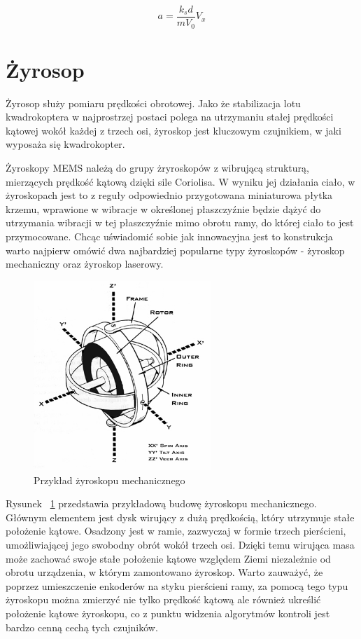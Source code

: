 \begin{equation}
	a = \frac{k{_s}d}{mV_0}V_x
\end{equation}

\section{Żyrosop}

Żyrosop służy pomiaru prędkości obrotowej. Jako że stabilizacja lotu kwadrokoptera w najprostrzej postaci polega na utrzymaniu stałej prędkości kątowej wokół każdej z trzech osi, żyroskop jest kluczowym czujnikiem, w jaki wyposaża się kwadrokopter. 

Żyroskopy MEMS należą do grupy żryroskopów z wibrującą strukturą, mierzących prędkość kątową dzięki sile Coriolisa. W wyniku jej działania ciało, w żyroskopach jest to z reguły odpowiednio przygotowana miniaturowa płytka krzemu, wprawione w wibracje w określonej płaszczyźnie będzie dążyć do utrzymania wibracji w tej płaszczyźnie mimo obrotu ramy, do której ciało to jest przymocowane. Chcąc uświadomić sobie jak innowacyjna jest to konstrukcja warto najpierw omówić dwa najbardziej popularne typy żyroskopów - żyroskop mechaniczny oraz żyroskop laserowy.

\begin{figure}[H]
	\centering
	\includegraphics[width=0.6\textwidth]{Pictures/Gyroscope_Theory.jpg}
	\caption[Przykład żyroskopu mechanicznego]{Przykład żyroskopu mechanicznego}
	\label{fig:Gyroscope_Theory}
\end{figure}

Rysunek ~\ref{fig:Gyroscope_Theory} przedstawia przykładową budowę żyroskopu mechanicznego. Głównym elementem jest dysk wirujący z dużą prędkością, który utrzymuje stałe położenie kątowe. Osadzony jest w ramie, zazwyczaj w formie trzech pierścieni, umożliwiającej jego swobodny obrót wokół trzech osi. Dzięki temu wirująca masa może zachować swoje stałe położenie kątowe względem Ziemi niezależnie od obrotu urządzenia, w którym zamontowano żyroskop. Warto zauważyć, że poprzez umieszczenie enkoderów na styku pierścieni ramy, za pomocą tego typu żyroskopu można zmierzyć nie tylko prędkość kątową ale również ukreślić położenie kątowe żyroskopu, co z punktu widzenia algorytmów kontroli jest bardzo cenną cechą tych czujników. 

